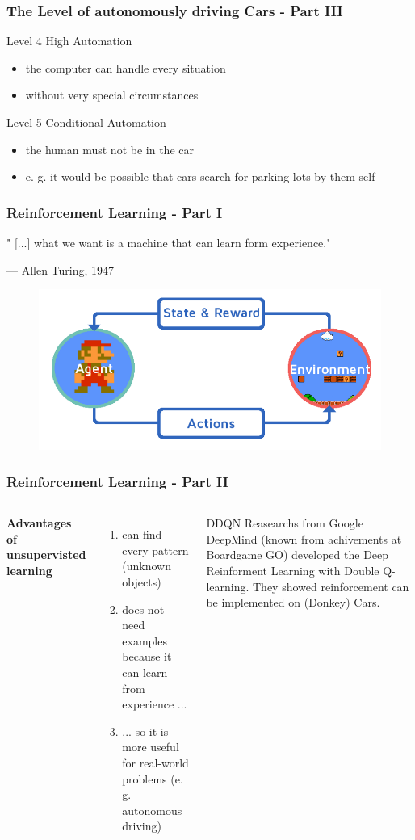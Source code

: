 \documentclass{beamer}
\begin{document}
\begin{frame}
\frametitle{The Level of autonomously driving Cars - Part III}
\begin{block}{Level 4}
High Automation
\begin{itemize}
\item the computer can handle every situation 
\item without very special circumstances
\end{itemize}
\end{block}
\begin{block}{Level 5}
Conditional Automation
\begin{itemize}
\item the human must not be in the car
\item e. g. it would be possible that cars search for parking lots by them self
\end{itemize}
\end{block}
\end{frame}
%
%
\begin{frame}
\frametitle{Reinforcement Learning - Part I}
\epigraph{ " [...] what we want is a machine that can learn form experience."}{--- \textup{ Allen Turing}, 1947}
\begin{figure}
\includegraphics[width=0.6\linewidth]{photo/rl}
\end{figure}
\end{frame}
%
%
\begin{frame}
\frametitle{Reinforcement Learning - Part II}
\begin{columns}[c] %
\textbf{Advantages of unsupervisted learning}
\begin{enumerate}
\item can find every pattern (unknown objects)
\item does not need examples because it can learn from experience ...
\item ... so it is more useful for real-world problems (e. g. autonomous driving)
\end{enumerate}
\begin{block}{DDQN}
Reasearchs from Google DeepMind (known from achivements at Boardgame GO) developed the Deep Reinforment Learning with Double Q-learning. They showed reinforcement can be implemented on (Donkey) Cars. 
\end{block}
\end{columns}
\end{frame}
\end{document}

